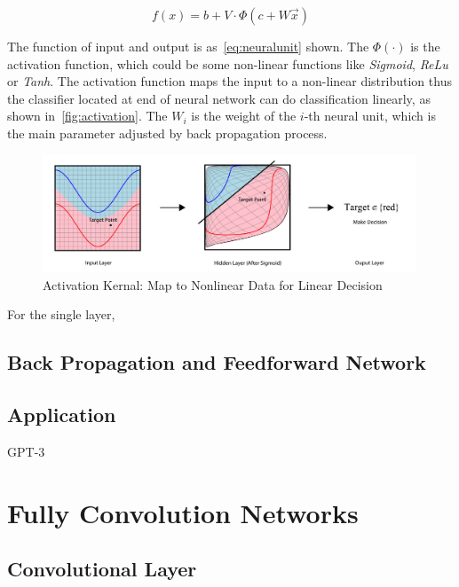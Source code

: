 \begin{spacing}{1.5}
\begin{equation}
\label{eq:neuralunit}
    f(x)=b+V \cdot \Phi (c+W \vec{x})
\end{equation}


The function of input and output is as~\autoref{eq:neuralunit} shown. The $\Phi (\cdot)$ is the activation function, which could be some non-linear functions like \textit{Sigmoid}, \textit{ReLu} or \textit{Tanh}. The activation function maps the input to a non-linear distribution thus the classifier located at end of neural network can do classification linearly, as shown in~\autoref{fig:activation}. The $W_i$ is the weight of the $i$-th neural unit, which is the main parameter adjusted by back propagation process.


\begin{figure}[th]
\centering
\includegraphics[width=0.99\textwidth, fbox]{Chapter2/activation.pdf}
\caption{Activation Kernal: Map to Nonlinear Data for Linear Decision}
\label{fig:activation} 
\end{figure}

For the single layer, 

\subsection{Back Propagation and Feedforward Network}
\label{subsec:back_propagation}

\subsection{Application}

GPT-3~\cite{brown2020language}

\section{Fully Convolution Networks}
\label{sec:LR_FCN}

\subsection{Convolutional Layer}


\end{spacing}
